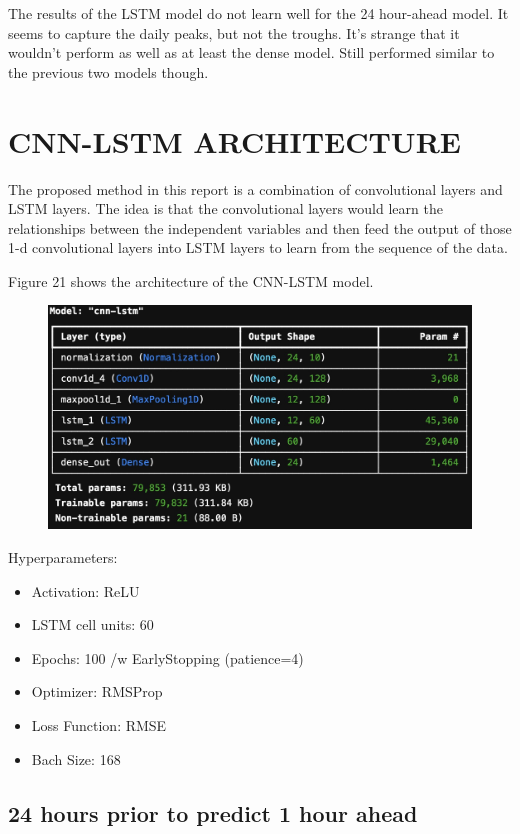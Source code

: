 \documentclass[9pt,a4paper,twoside]{rho}
\begin{document}
\noindent The results of the LSTM model do not learn well for the 24 hour-ahead model. It seems to capture the daily peaks, but not the troughs. It's strange that it wouldn't perform as well as at least the dense model. Still performed similar to the previous two models though.

\section*{CNN-LSTM ARCHITECTURE}

The proposed method in this report is a combination of convolutional layers and LSTM layers. The idea is that the convolutional layers would learn the relationships between the independent variables and then feed the output of those 1-d convolutional layers into LSTM layers to learn from the sequence of the data.

\noindent Figure 21 shows the architecture of the CNN-LSTM model.
\begin{figure}[H]
	\centering
	\includegraphics[width=0.8\columnwidth]{Figures/CNN-LSTM_Architecture.png}
\end{figure}

\noindent Hyperparameters:
\begin{itemize}
	\item Activation: ReLU
	\item LSTM cell units: 60
	\item Epochs: 100 /w EarlyStopping (patience=4)
	\item Optimizer: RMSProp
	\item Loss Function: RMSE
	\item Bach Size: 168
\end{itemize}


\subsection*{24 hours prior to predict 1 hour ahead}
\end{document}
